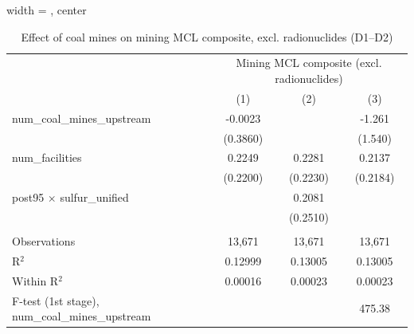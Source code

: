 
\begin{table}[htbp]
   
   \caption{\label{2sls_4step_d1_d2_mining_mcl_norad} Effect of coal mines on mining MCL composite, excl. radionuclides (D1--D2)}
   \bigskip
   
   \centering
   
   \begin{adjustbox}{width = \textwidth, center}
      
      
      \begin{tabular}{lccc}
         \toprule
         
          & \multicolumn{3}{c}{Mining MCL composite (excl. radionuclides)}\\
         
                                                           & (1)           & (2)           & (3)\\  
         
         \midrule 
         num\_coal\_mines\_upstream                        & -0.0023       &               & -1.261\\   
                                                           & (0.3860)      &               & (1.540)\\   
         num\_facilities                                   & 0.2249        & 0.2281        & 0.2137\\   
                                                           & (0.2200)      & (0.2230)      & (0.2184)\\   
         post95 $\times$ sulfur\_unified                   &               & 0.2081        &   \\   
                                                           &               & (0.2510)      &   \\   
         
          \\
         
         Observations                                      & 13,671        & 13,671        & 13,671\\  
         R$^2$                                             & 0.12999       & 0.13005       & 0.13005\\  
         Within R$^2$                                      & 0.00016       & 0.00023       & 0.00023\\  
         F-test (1st stage), num\_coal\_mines\_upstream    &               &               & 475.38\\  
         

\end{tabular}
\end{adjustbox}
\end{table}
